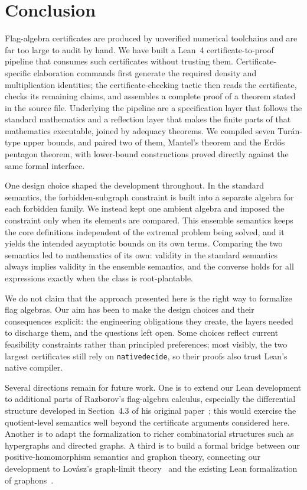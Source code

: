 \documentclass[acmsmall,screen=true,acmthm=false]{acmart}
\DeclareRobustCommand{\lean}[1]{{\def\_{\textunderscore\allowbreak}\texttt{#1}}}
\begin{document}
\section{Conclusion}
\label{sec:conclusion}

Flag-algebra certificates are produced by unverified numerical toolchains and
are far too large to audit by hand.  We have built a Lean~4
certificate-to-proof pipeline that consumes such certificates without trusting
them.  Certificate-specific elaboration commands first generate the required
density and multiplication identities; the certificate-checking tactic then
reads the certificate, checks its remaining claims, and assembles a complete
proof of a theorem stated in the source file.  Underlying the pipeline are a
specification layer that follows the standard mathematics and a reflection
layer that makes the finite parts of that mathematics executable, joined by
adequacy theorems.  We compiled seven Tur\'an-type upper bounds, and paired two
of them, Mantel's theorem and the Erd\H{o}s pentagon theorem, with lower-bound
constructions proved directly against the same formal interface.

One design choice shaped the development throughout.  In the standard
semantics, the forbidden-subgraph constraint is built into a separate algebra
for each forbidden family.  We instead kept one ambient algebra and imposed the
constraint only when its elements are compared.  This ensemble semantics keeps
the core definitions independent of the extremal problem being solved, and it
yields the intended asymptotic bounds on its own terms.  Comparing the two
semantics led to mathematics of its own: validity in the standard semantics
always implies validity in the ensemble semantics, and the converse holds for
all expressions exactly when the class is root-plantable.

We do not claim that the approach presented here is the right way to formalize
flag algebras.  Our aim
has been to make the design choices and their consequences explicit: the
engineering obligations they create, the layers needed to discharge them, and
the questions left open.  Some choices reflect current feasibility constraints
rather than principled preferences; most visibly, the two largest certificates
still rely on \lean{native\_decide}, so their proofs also trust Lean's native
compiler.

Several directions remain for future work.  One is to extend our Lean
development to additional parts of Razborov's flag-algebra calculus, especially
the differential structure developed in Section~4.3 of his original
paper~\cite{razborov2007flag}; this would exercise the quotient-level semantics
well beyond the certificate arguments considered here.  Another is to adapt the
formalization to richer combinatorial structures such as hypergraphs and
directed graphs.  A third is to build a formal bridge between our
positive-homomorphism semantics and graphon theory, connecting our development
to Lov\'asz's graph-limit theory~\cite{lovasz2012large} and the existing Lean
formalization of graphons~\cite{freer2026graphon}.
\end{document}
